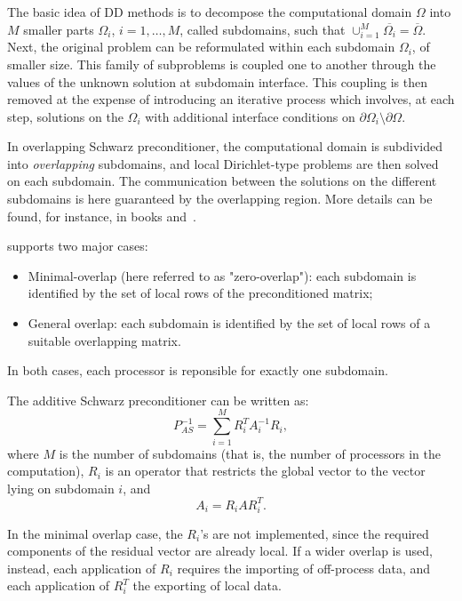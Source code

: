 The basic idea of DD methods is to decompose the
computational domain $\Omega$ into $M$ smaller parts $\Omega_i$,
$i=1,\ldots,M$, called subdomains, such that $\cup_{i=1}^{M}
\overline{\Omega_i} = \overline{\Omega}$.  Next, the original problem can
be reformulated within each subdomain $\Omega_i$, of smaller size. This
family of subproblems is coupled one to another through the values of the
unknown solution at subdomain interface. This coupling is then removed at
the expense of introducing an iterative process which involves, at each
step, solutions on the $\Omega_i$ with additional interface conditions on
$\partial \Omega_i \setminus \partial \Omega$.

In overlapping Schwarz preconditioner, the computational domain is
subdivided into {\sl overlapping} subdomains, and local Dirichlet-type
problems are then solved on each subdomain.  The communication between the
solutions on the different subdomains is here guaranteed by the overlapping
region. More details can be found, for instance, in books
\cite{QV} and~\cite{smith96parallel}.

\ifpack supports two major cases:
\begin{itemize}
\item Minimal-overlap (here referred to as "zero-overlap"): each subdomain
is identified by the set of local rows of the preconditioned matrix;
\item General overlap: each subdomain is identified by the set of local rows
of a suitable overlapping matrix.
\end{itemize}
In both cases, each processor is reponsible for exactly one subdomain.

The additive Schwarz preconditioner can be written as:
\begin{equation}
\label{eq:as}
P_{AS}^{-1} = \sum_{i=1}^M R_i^T A_i^{-1} R_i ,
\end{equation}
where $M$ is the number of subdomains (that is, the number of processors in
the computation), $R_i$ is an operator that restricts the global 
vector to the vector lying on subdomain $i$, and
\begin{equation}
\label{eq:Ai}
A_i = R_i A R_i^T.
\end{equation}

In the minimal overlap case, the $R_i$'s are not implemented, since the
required components of the residual vector are already local. If a wider overlap
is used, instead, each application of $R_i$ requires the importing of
off-process data, and each application of $R_i^T$ the exporting of local data.


